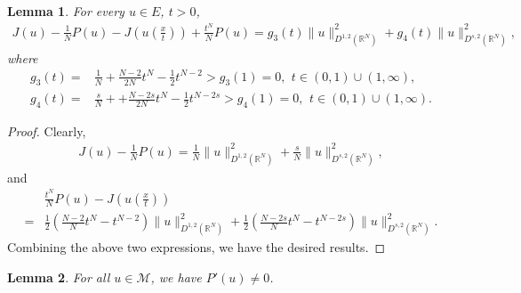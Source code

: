 \documentclass[12pt,a4paper,reqno]{amsart}
\numberwithin{equation}{section}
\newtheorem{lemma}{Lemma}[section]
\begin{document}
\begin{lemma}\label{Lemma5.4}
For every $u\in E$,
$t>0$,
\begin{equation*}
\begin{aligned}
J(u)
-
\frac{1}{N}P(u)
-
J\left(u\left(\frac{x}{t}\right)\right)
+
\frac{t^{N}}{N}P(u)
=
g_{3}(t)
\|u\|_{D^{1,2}(\mathbb{R}^{N})}^{2}
+
g_{4}(t)
\|u\|_{D^{s,2}(\mathbb{R}^{N})}^{2},
\end{aligned}
\end{equation*}
where
\begin{equation*}
\begin{aligned}
g_{3}(t)
=&
\frac{1}{N}
+
\frac{N-2}{2N}t^{N}
-
\frac{1}{2}
t^{N-2}
>
g_{3}(1)=0,
\ \,
t\in(0,1)\cup (1,\infty),
\\
g_{4}(t)
=&
\frac{s}{N}
+
+
\frac{N-2s}{2N}t^{N}
-
\frac{1}{2}
t^{N-2s}
>
g_{4}(1)=0,
\ \,
t\in(0,1)\cup(1,\infty).
\end{aligned}
\end{equation*}	
\end{lemma}




\begin{proof}
Clearly,
\begin{equation*}
\begin{aligned}
J(u)-\frac{1}{N}P(u)
=
\frac{1}{N}
\|u\|_{D^{1,2}(\mathbb{R}^{N})}^{2}
+
\frac{s}{N}
\|u\|_{D^{s,2}(\mathbb{R}^{N})}^{2},
\end{aligned}
\end{equation*}
and
\begin{equation*}
\begin{aligned}
&\frac{t^{N}}{N}
P(u)
-
J\left(u\left(\frac{x}{t}\right)\right)\\
=&
\frac{1}{2}
\left(
\frac{N-2}{N}t^{N}
-
t^{N-2}
\right)
\|u\|_{D^{1,2}(\mathbb{R}^{N})}^{2}
+
\frac{1}{2}
\left(
\frac{N-2s}{N}t^{N}
-
t^{N-2s}\right)
\|u\|_{D^{s,2}(\mathbb{R}^{N})}^{2}.
\end{aligned}
\end{equation*}
Combining the above two expressions, we have the desired results.
\end{proof}

\begin{lemma}\label{Lemma5.5}
For all $u\in \mathcal{M}$, we have $P'(u)\not=0$.
\end{lemma}
\end{document}
